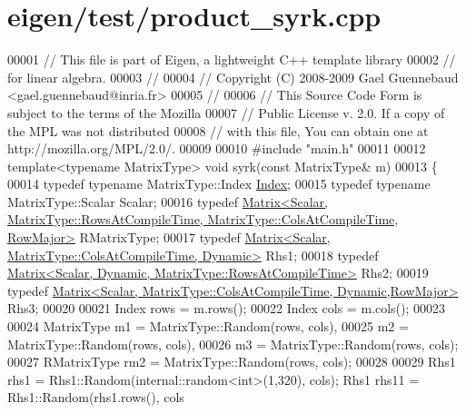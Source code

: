\hypertarget{eigen_2test_2product__syrk_8cpp_source}{}\section{eigen/test/product\+\_\+syrk.cpp}
\label{eigen_2test_2product__syrk_8cpp_source}

\begin{DoxyCode}
00001 \textcolor{comment}{// This file is part of Eigen, a lightweight C++ template library}
00002 \textcolor{comment}{// for linear algebra.}
00003 \textcolor{comment}{//}
00004 \textcolor{comment}{// Copyright (C) 2008-2009 Gael Guennebaud <gael.guennebaud@inria.fr>}
00005 \textcolor{comment}{//}
00006 \textcolor{comment}{// This Source Code Form is subject to the terms of the Mozilla}
00007 \textcolor{comment}{// Public License v. 2.0. If a copy of the MPL was not distributed}
00008 \textcolor{comment}{// with this file, You can obtain one at http://mozilla.org/MPL/2.0/.}
00009 
00010 \textcolor{preprocessor}{#include "main.h"}
00011 
00012 \textcolor{keyword}{template}<\textcolor{keyword}{typename} MatrixType> \textcolor{keywordtype}{void} syrk(\textcolor{keyword}{const} MatrixType& m)
00013 \{
00014   \textcolor{keyword}{typedef} \textcolor{keyword}{typename} MatrixType::Index \hyperlink{namespace_eigen_a62e77e0933482dafde8fe197d9a2cfde}{Index};
00015   \textcolor{keyword}{typedef} \textcolor{keyword}{typename} MatrixType::Scalar Scalar;
00016   \textcolor{keyword}{typedef} 
      \hyperlink{group___core___module_class_eigen_1_1_matrix}{Matrix<Scalar, MatrixType::RowsAtCompileTime, MatrixType::ColsAtCompileTime, RowMajor>}
       RMatrixType;
00017   \textcolor{keyword}{typedef} \hyperlink{group___core___module_class_eigen_1_1_matrix}{Matrix<Scalar, MatrixType::ColsAtCompileTime, Dynamic>}
       Rhs1;
00018   \textcolor{keyword}{typedef} \hyperlink{group___core___module_class_eigen_1_1_matrix}{Matrix<Scalar, Dynamic, MatrixType::RowsAtCompileTime>}
       Rhs2;
00019   \textcolor{keyword}{typedef} \hyperlink{group___core___module_class_eigen_1_1_matrix}{Matrix<Scalar, MatrixType::ColsAtCompileTime, Dynamic,RowMajor>}
       Rhs3;
00020 
00021   Index rows = m.rows();
00022   Index cols = m.cols();
00023 
00024   MatrixType m1 = MatrixType::Random(rows, cols),
00025              m2 = MatrixType::Random(rows, cols),
00026              m3 = MatrixType::Random(rows, cols);
00027   RMatrixType rm2 = MatrixType::Random(rows, cols);
00028 
00029   Rhs1 rhs1 = Rhs1::Random(internal::random<int>(1,320), cols); Rhs1 rhs11 = Rhs1::Random(rhs1.rows(), cols

\end{DoxyCode}
